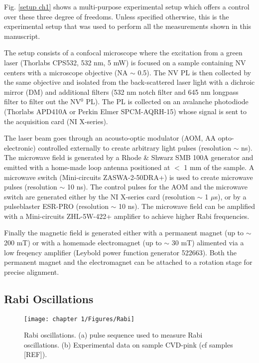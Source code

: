 \documentclass[a4paper, 11pt]{book}
\begin{document}
Fig. \ref{setup ch1} shows a multi-purpose experimental setup which offers a control over these three degree of freedoms. Unless specified otherwise, this is the experimental setup that was used to perform all the measurements shown in this manuscript. 

The setup consists of a confocal microscope where the excitation from a green laser (Thorlabs CPS532, 532 nm, 5 mW) is focused on a sample containing NV centers with a microscope objective (NA $\sim$ 0.5). The NV PL is then collected by the same objective and isolated from the back-scattered laser light with a dichroic mirror (DM) and additional filters (532 nm notch filter and 645 nm longpass filter to filter out the NV$^0$ PL). The PL is collected on an avalanche photodiode (Thorlabs APD410A or Perkin Elmer SPCM-AQRH-15) whose signal is sent to the acquisition card (NI X-series).

The laser beam goes through an acousto-optic modulator (AOM, AA opto-electronic) controlled externally to create arbitrary light pulses (resolution $\sim$ ns). The microwave field is generated by a Rhode \& Shwarz SMB 100A generator and emitted with a home-made loop antenna positioned at $<$ 1 mm of the sample. A microwave switch (Mini-circuits ZASWA-2-50DRA+) is used to create microwave pulses (resolution $\sim$ 10 ns). The control pulses for the AOM and the microwave switch are generated either by the NI X-series card (resolution $\sim$ 1 $\mu$s), or by a pulseblaster ESR-PRO (resolution $\sim$ 10 ns). The microwave field can be amplified with a Mini-circuits ZHL-5W-422+ amplifier to achieve higher Rabi frequencies. 

Finally the magnetic field is generated either with a permanent magnet (up to $\sim$ 200 mT) or with a homemade electromagnet (up to $\sim$ 30 mT) alimented via a low freqency amplifier (Leybold power function generator 522663). Both the permanent magnet and the electromagnet can be  attached to a rotation stage for precise alignment.
\subsection{Rabi Oscillations}
\begin{figure}[h!]
\centering
\texttt{[image: chapter 1/Figures/Rabi]}
\caption{Rabi oscillations. (a) pulse sequence used to measure Rabi oscillations. (b) Experimental data on sample CVD-pink (cf samples [REF]).}
\label{Rabi}
\end{figure}
\end{document}
